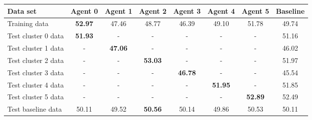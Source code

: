 
    \begin{tabular}{l c c c c c c c}
    \toprule

    Data set & Agent 0 & Agent 1 & Agent 2 & Agent 3 & Agent 4 & Agent 5 & Baseline \\
    
    \midrule
    Training data & \textbf{52.97} & 47.46 & 48.77 & 46.39 & 49.10 & 51.78 & 49.74\\
    \hline
    Test cluster 0 data & \textbf{51.93} & - & - & - & - & - & 51.16 \\
    Test cluster 1 data & - & \textbf{47.06} & - & - & - & - & 46.02\\
    Test cluster 2 data & - & - & \textbf{53.03} & - & - & - & 51.97\\
    Test cluster 3 data & - & - & - & \textbf{46.78} & - & - & 45.54\\
    Test cluster 4 data & - & - & - & - & \textbf{51.95} & - & 51.85\\
    Test cluster 5 data & - & - & - & - & - & \textbf{52.89} & 52.49\\
    Test baseline data & 50.11 & 49.52 & \textbf{50.56} & 50.14 & 49.86 & 50.53 & 50.11\\
    \bottomrule
        
    \end{tabular}
